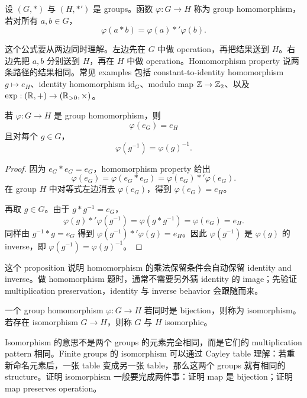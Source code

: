 \begin{definition}
设 \((G,*)\) 与 \((H,*')\) 是 groups。函数 \(\varphi:G\to H\) 称为 group homomorphism，若对所有 \(a,b\in G\)，
\[
  \varphi(a*b)=\varphi(a)*'\varphi(b).
\]
\end{definition}

这个公式要从两边同时理解。左边先在 \(G\) 中做 operation，再把结果送到 \(H\)。右边先把 \(a,b\) 分别送到 \(H\)，再在 \(H\) 中做 operation。Homomorphism property 说两条路径的结果相同。常见 examples 包括 constant-to-identity homomorphism \(g\mapsto e_H\)、identity homomorphism \(\mathrm{id}_G\)、modulo map \(\mathbb{Z}\to\mathbb{Z}_2\)、以及 \(\exp:(\mathbb{R},+)\to(\mathbb{R}_{>0},\times)\)。

\begin{proposition}
若 \(\varphi:G\to H\) 是 group homomorphism，则
\[
  \varphi(e_G)=e_H
\]
且对每个 \(g\in G\)，
\[
  \varphi(g^{-1})=\varphi(g)^{-1}.
\]
\end{proposition}

\begin{proof}
因为 \(e_G*e_G=e_G\)，homomorphism property 给出
\[
  \varphi(e_G)=\varphi(e_G*e_G)=\varphi(e_G)*'\varphi(e_G).
\]
在 group \(H\) 中对等式左边消去 \(\varphi(e_G)\)，得到 \(\varphi(e_G)=e_H\)。

再取 \(g\in G\)。由于 \(g*g^{-1}=e_G\)，
\[
  \varphi(g)*'\varphi(g^{-1})
  =\varphi(g*g^{-1})
  =\varphi(e_G)
  =e_H.
\]
同样由 \(g^{-1}*g=e_G\) 得到 \(\varphi(g^{-1})*'\varphi(g)=e_H\)。因此 \(\varphi(g^{-1})\) 是 \(\varphi(g)\) 的 inverse，即 \(\varphi(g^{-1})=\varphi(g)^{-1}\)。
\end{proof}

这个 proposition 说明 homomorphism 的乘法保留条件会自动保留 identity and inverse。做 homomorphism 题时，通常不需要另外猜 identity 的 image；先验证 multiplication preservation，identity 与 inverse behavior 会跟随而来。

\begin{definition}[isomorphism]
一个 group homomorphism \(\varphi:G\to H\) 若同时是 bijection，则称为 isomorphism。若存在 isomorphism \(G\to H\)，则称 \(G\) 与 \(H\) isomorphic。
\end{definition}

Isomorphism 的意思不是两个 groups 的元素完全相同，而是它们的 multiplication pattern 相同。Finite groups 的 isomorphism 可以通过 Cayley table 理解：若重新命名元素后，一张 table 变成另一张 table，那么这两个 groups 就有相同的 structure。证明 isomorphism 一般要完成两件事：证明 map 是 bijection；证明 map preserves operation。

